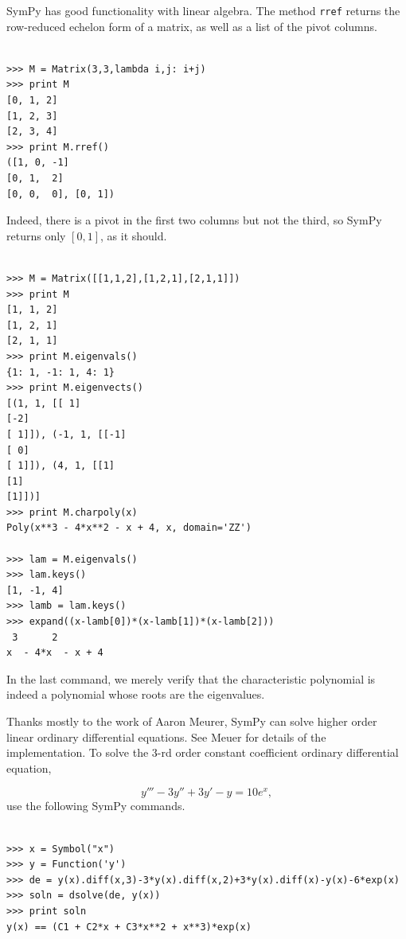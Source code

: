 \documentclass[12pt]{article}
\begin{document}
SymPy has good functionality with linear algebra.
The method {\tt rref} returns the row-reduced echelon form of a matrix,
as well as a list of the pivot columns.

\begin{Verbatim}[fontsize=\scriptsize,fontfamily=courier,fontshape=tt,frame=single,label=SymPy]

>>> M = Matrix(3,3,lambda i,j: i+j)
>>> print M
[0, 1, 2]
[1, 2, 3]
[2, 3, 4]
>>> print M.rref()
([1, 0, -1]
[0, 1,  2]
[0, 0,  0], [0, 1])

\end{Verbatim}

\noindent
Indeed, there is a pivot in the first two columns but not the
third, so SymPy returns only $[0,1]$, as it should.

\begin{Verbatim}[fontsize=\scriptsize,fontfamily=courier,fontshape=tt,frame=single,label=SymPy]

>>> M = Matrix([[1,1,2],[1,2,1],[2,1,1]])
>>> print M
[1, 1, 2]
[1, 2, 1]
[2, 1, 1]
>>> print M.eigenvals()
{1: 1, -1: 1, 4: 1}
>>> print M.eigenvects()
[(1, 1, [[ 1]
[-2]
[ 1]]), (-1, 1, [[-1]
[ 0]
[ 1]]), (4, 1, [[1]
[1]
[1]])]
>>> print M.charpoly(x)
Poly(x**3 - 4*x**2 - x + 4, x, domain='ZZ')

>>> lam = M.eigenvals()
>>> lam.keys()                
[1, -1, 4]
>>> lamb = lam.keys()
>>> expand((x-lamb[0])*(x-lamb[1])*(x-lamb[2]))
 3      2        
x  - 4*x  - x + 4

\end{Verbatim}

\noindent
In the last command, we merely verify that the characteristic
polynomial is indeed a polynomial whose roots are the eigenvalues.

Thanks mostly to the work of Aaron Meurer, 
SymPy can solve higher order linear ordinary differential equations.
See Meuer \cite{M} for details of the implementation.
To solve the $3$-rd order constant coefficient ordinary differential
equation,

\[
y'''-3y''+3y'-y=10e^x,
\]
use the following SymPy commands.

\begin{Verbatim}[fontsize=\scriptsize,fontfamily=courier,fontshape=tt,frame=single,label=SymPy]

>>> x = Symbol("x")
>>> y = Function('y')
>>> de = y(x).diff(x,3)-3*y(x).diff(x,2)+3*y(x).diff(x)-y(x)-6*exp(x)
>>> soln = dsolve(de, y(x))
>>> print soln
y(x) == (C1 + C2*x + C3*x**2 + x**3)*exp(x)

\end{Verbatim}
\end{document}
